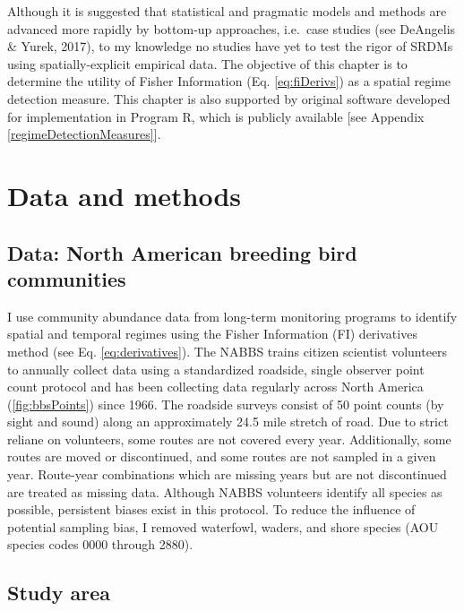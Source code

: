 \documentclass[12pt,twoside,openany]{reedthesis}
\begin{document}
Although it is suggested that statistical and pragmatic models and
methods are advanced more rapidly by bottom-up approaches, i.e.~case
studies (see DeAngelis \& Yurek, 2017), to my knowledge no studies have
yet to test the rigor of SRDMs using spatially-explicit empirical data.
The objective of this chapter is to determine the utility of Fisher
Information (Eq. \eqref{eq:fiDerivs}) as a spatial regime detection
measure. This chapter is also supported by original software developed
for implementation in Program R, which is publicly available {[}see
Appendix \ref{regimeDetectionMeasures}{]}.

\section{Data and methods}\label{data-and-methods}

\subsection{Data: North American breeding bird
communities}\label{data-north-american-breeding-bird-communities}

I use community abundance data from long-term monitoring programs to
identify spatial and temporal regimes using the Fisher Information (FI)
derivatives method (see Eq. \eqref{eq:derivatives}). The NABBS trains
citizen scientist volunteers to annually collect data using a
standardized roadside, single observer point count protocol and has been
collecting data regularly across North America (\ref{fig:bbsPoints})
since 1966. The roadside surveys consist of 50 point counts (by sight
and sound) along an approximately 24.5 mile stretch of road. Due to
strict reliane on volunteers, some routes are not covered every year.
Additionally, some routes are moved or discontinued, and some routes are
not sampled in a given year. Route-year combinations which are missing
years but are not discontinued are treated as missing data. Although
NABBS volunteers identify all species as possible, persistent biases
exist in this protocol. To reduce the influence of potential sampling
bias, I removed waterfowl, waders, and shore species (AOU species codes
0000 through 2880).

\subsection{Study area}\label{study-area}
\end{document}
